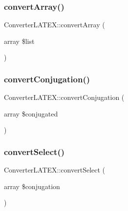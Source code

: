 \subsubsection{\texorpdfstring{convert\+Array()}{convertArray()}}
{\footnotesize\ttfamily Converter\+L\+A\+T\+E\+X\+::convert\+Array (\begin{DoxyParamCaption}\item[{array}]{\$list }\end{DoxyParamCaption})}

\hypertarget{class_converter_l_a_t_e_x_ada7781cb4daaf2f4a2f0c69e1d2f24e6}{}\label{class_converter_l_a_t_e_x_ada7781cb4daaf2f4a2f0c69e1d2f24e6} 
\subsubsection{\texorpdfstring{convert\+Conjugation()}{convertConjugation()}}
{\footnotesize\ttfamily Converter\+L\+A\+T\+E\+X\+::convert\+Conjugation (\begin{DoxyParamCaption}\item[{array}]{\$conjugated }\end{DoxyParamCaption})}

\hypertarget{class_converter_l_a_t_e_x_a21a5d5c23b40c7bb3b5cd7ebdbee3cae}{}\label{class_converter_l_a_t_e_x_a21a5d5c23b40c7bb3b5cd7ebdbee3cae} 
\subsubsection{\texorpdfstring{convert\+Select()}{convertSelect()}}
{\footnotesize\ttfamily Converter\+L\+A\+T\+E\+X\+::convert\+Select (\begin{DoxyParamCaption}\item[{array}]{\$conjugation }\end{DoxyParamCaption})}

\hypertarget{class_converter_l_a_t_e_x_a99d0b931aa33c2e4282c28f03b248e85}{}\label{class_converter_l_a_t_e_x_a99d0b931aa33c2e4282c28f03b248e85} 
